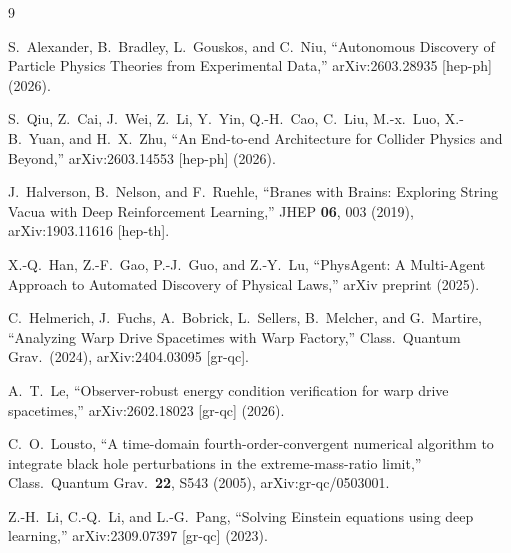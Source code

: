 \documentclass[twocolumn,floatfix,aps,prd,nofootinbib]{revtex4-2}
\begin{document}
\begin{thebibliography}{9}

S.~Alexander, B.~Bradley, L.~Gouskos, and C.~Niu,
\newblock ``Autonomous Discovery of Particle Physics Theories from Experimental Data,''
\newblock arXiv:2603.28935 [hep-ph] (2026).

S.~Qiu, Z.~Cai, J.~Wei, Z.~Li, Y.~Yin, Q.-H.~Cao, C.~Liu, M.-x.~Luo, X.-B.~Yuan, and H.~X.~Zhu,
\newblock ``An End-to-end Architecture for Collider Physics and Beyond,''
\newblock arXiv:2603.14553 [hep-ph] (2026).

J.~Halverson, B.~Nelson, and F.~Ruehle,
\newblock ``Branes with Brains: Exploring String Vacua with Deep Reinforcement Learning,''
\newblock JHEP \textbf{06}, 003 (2019), arXiv:1903.11616 [hep-th].

X.-Q.~Han, Z.-F.~Gao, P.-J.~Guo, and Z.-Y.~Lu,
\newblock ``PhysAgent: A Multi-Agent Approach to Automated Discovery of Physical Laws,''
\newblock arXiv preprint (2025).

C.~Helmerich, J.~Fuchs, A.~Bobrick, L.~Sellers, B.~Melcher, and G.~Martire,
\newblock ``Analyzing Warp Drive Spacetimes with Warp Factory,''
\newblock Class.\ Quantum Grav.\ (2024), arXiv:2404.03095 [gr-qc].

A.~T.~Le,
\newblock ``Observer-robust energy condition verification for warp drive spacetimes,''
\newblock arXiv:2602.18023 [gr-qc] (2026).

C.~O.~Lousto,
\newblock ``A time-domain fourth-order-convergent numerical algorithm to integrate black hole perturbations in the extreme-mass-ratio limit,''
\newblock Class.\ Quantum Grav.\ \textbf{22}, S543 (2005), arXiv:gr-qc/0503001.

Z.-H.~Li, C.-Q.~Li, and L.-G.~Pang,
\newblock ``Solving Einstein equations using deep learning,''
\newblock arXiv:2309.07397 [gr-qc] (2023).

\end{thebibliography}
\end{document}
